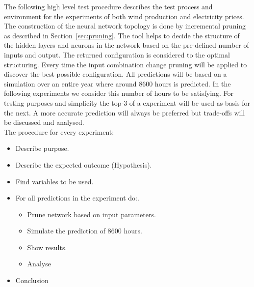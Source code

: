 The following high level test procedure describes the test process and environment for the experiments of both wind production and electricity prices. 
\\[0.5cm]
The construction of the neural network topology is done by incremental pruning as described in Section~\ref{sec:pruning}. The tool helps to decide the structure of the hidden layers and neurons in the network based on the pre-defined number of inputs and output. The returned configuration is considered to the optimal structuring. Every time the input combination change pruning will be applied to discover the best possible configuration. All predictions will be based on a simulation over an entire year where around 8600 hours is predicted. In the following experiments we consider this number of hours to be satisfying.  For testing purposes and simplicity the top-3 of a experiment will be used as basis for the next. A more accurate prediction will always be preferred but trade-offs will be discussed and analysed.
\\[0.5cm]
The procedure for every experiment:
\begin{itemize}
\item Describe purpose.
\item Describe the expected outcome (Hypothesis).
\item Find variables to be used.
\item For all predictions in the experiment do:.
\begin{itemize}
	\item Prune network based on input parameters.
	\item Simulate the prediction of 8600 hours.
	\item Show results.
	\item Analyse
\end{itemize}
\item Conclusion

\end{itemize}
